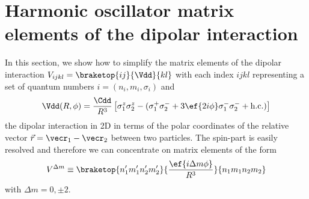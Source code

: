 \chapter{Harmonic oscillator matrix elements of the dipolar interaction}
\label{ap:matrix_elements}

In this section, we show how to simplify the matrix elements of the dipolar interaction $V_{ijkl}=\braketop{ij}{\Vdd}{kl}$ with each index $ijkl$ representing a set of quantum numbers $i=(n_i,m_i,\sigma_i)$ and
\begin{align*}
\Vdd(R,\phi) =  \frac{\Cdd}{R^3} \left[
\sigma^z_1 \sigma^z_2 - (\sigma^+_1 \sigma^-_2 +3 \ef{2i\phi} \sigma^-_1 \sigma^-_2  +\text{h.c.})
\right]
\end{align*}
the dipolar interaction in 2D in terms of the polar coordinates of the relative vector $\vec{r}=\vecr_1-\vecr_2$ between two particles. The spin-part is easily resolved and therefore we can concentrate on matrix elements of the form
\begin{align*}
V^{\Delta m}\equiv\braketop{n_1'm_1'n_2'm_2'}{\frac{\ef{i\Delta m\phi}}{R^3}}{n_1m_1n_2m_2}
\end{align*}
with $\Delta m = 0, \pm 2$.

